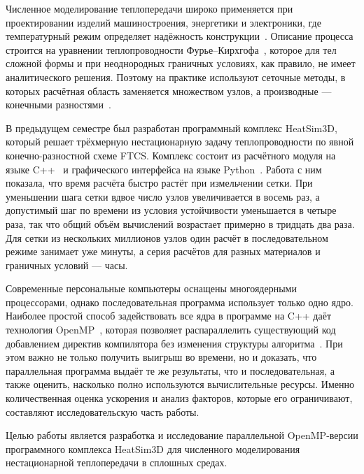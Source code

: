 \intro

Численное моделирование теплопередачи широко применяется при проектировании изделий машиностроения, энергетики и электроники, где температурный режим определяет надёжность конструкции~\cite{krainov2016}. Описание процесса строится на уравнении теплопроводности Фурье--Кирхгофа~\cite{chichko2013mathematical}, которое для тел сложной формы и при неоднородных граничных условиях, как правило, не имеет аналитического решения. Поэтому на практике используют сеточные методы, в которых расчётная область заменяется множеством узлов, а производные --- конечными разностями~\cite{kolgan1975finite}.

В предыдущем семестре был разработан программный комплекс HeatSim3D, который решает трёхмерную нестационарную задачу теплопроводности по явной конечно-разностной схеме FTCS. Комплекс состоит из расчётного модуля на языке C++~\cite{stroustrup1986overview} и графического интерфейса на языке Python~\cite{python2021python}. Работа с ним показала, что время расчёта быстро растёт при измельчении сетки. При уменьшении шага сетки вдвое число узлов увеличивается в восемь раз, а допустимый шаг по времени из условия устойчивости уменьшается в четыре раза, так что общий объём вычислений возрастает примерно в тридцать два раза. Для сетки из нескольких миллионов узлов один расчёт в последовательном режиме занимает уже минуты, а серия расчётов для разных материалов и граничных условий --- часы.

Современные персональные компьютеры оснащены многоядерными процессорами, однако последовательная программа использует только одно ядро. Наиболее простой способ задействовать все ядра в программе на C++ даёт технология OpenMP~\cite{dagum1998openmp}, которая позволяет распараллелить существующий код добавлением директив компилятора без изменения структуры алгоритма~\cite{chandra2001parallel}. При этом важно не только получить выигрыш во времени, но и доказать, что параллельная программа выдаёт те же результаты, что и последовательная, а также оценить, насколько полно используются вычислительные ресурсы. Именно количественная оценка ускорения и анализ факторов, которые его ограничивают, составляют исследовательскую часть работы.

Целью работы является разработка и исследование параллельной OpenMP-версии программного комплекса HeatSim3D для численного моделирования нестационарной теплопередачи в сплошных средах.

